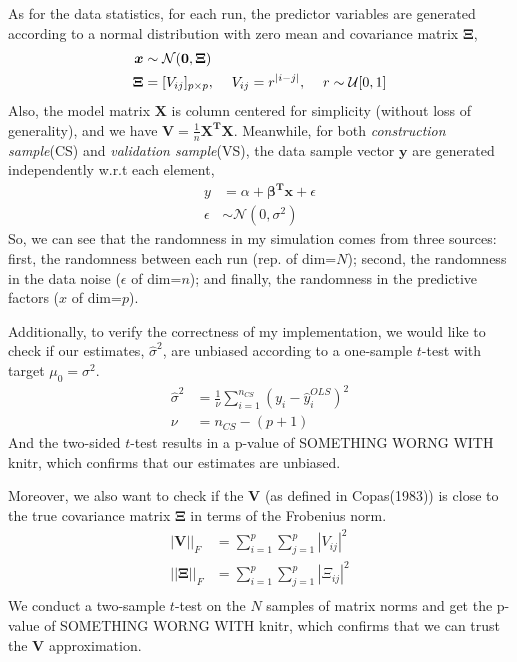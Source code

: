 \documentclass{article}
\newcommand{\rinline}[1]{SOMETHING WORNG WITH knitr}
\begin{document}
As for the data statistics, for each run, the predictor variables are
generated according to a normal distribution with zero mean and
covariance matrix $\bm{\Xi}$,
\begin{displaymath}
\begin{split}
\bm{x} &\sim  \mathcal{\bm{N}}(\bm{0}, \bm{\Xi})\\
\bm{\Xi} &= [V_{ij}]_{p\times p} , \hspace{12 pt} V_{ij} = r^{|i-j|},
\hspace{12 pt} r \sim \mathcal{U}[0,1]
\end{split}
\end{displaymath}
Also, the model matrix $\bm{X}$ is column centered for simplicity
(without loss of generality), and we have $\bm{V}=\frac{1}{n}\bm{X^TX}$. 
Meanwhile, for both \textit{construction sample}(CS) and
\textit{validation sample}(VS), the data sample vector
$\bm{y}$ are generated independently w.r.t each element,
\begin{displaymath}
\begin{split}
y &= \alpha + \bm{\beta^Tx} + \epsilon\\
\epsilon &\sim \mathcal{N}(0, \sigma^2)
\end{split}
\end{displaymath}
So, we can see that the randomness in my simulation comes from three
sources: first, the randomness between each run (rep. of dim=$N$); second, the
randomness in the data noise ($\epsilon$ of dim=$n$); and finally, the
randomness in the predictive factors ($x$ of dim=$p$).


Additionally, to verify the correctness of my implementation, we would
like to check if our estimates, $\hat{\sigma}^2$, are unbiased according to
a one-sample $t$-test with target $\mu_0=\sigma^2$.
\begin{displaymath}
\begin{split}
\hat{\sigma}^2 &= \frac{1}{\nu}\sum_{i=1}^{n_{CS}} (y_i - \hat{y}_i^{OLS})^2 \\
\nu &= n_{CS} - (p+1)
\end{split}
\end{displaymath}
And the two-sided $t$-test results in a p-value of
\rinline{t.test(sig2hat, mu=sig2)$p.value}, 
which confirms that our estimates are unbiased.

Moreover, we also want to check if the $\bm{V}$ (as defined in
Copas(1983)) is close to the true covariance matrix $\bm{\Xi}$ in
terms of the Frobenius norm. 
\begin{displaymath}
\begin{split}
|\bm{V}||_F &= \sum_{i=1}^p \sum_{j=1}^p |V_{ij}|^2 \\
||\bm{\Xi}||_F &= \sum_{i=1}^p \sum_{j=1}^p |\Xi_{ij}|^2 \\
\end{split}
\end{displaymath}
We conduct a two-sample $t$-test on the $N$ samples of matrix norms
and get the p-value of 
\rinline{t.test(Vnorm, covXnorm)$p.value},
which confirms that we can trust the $\bm{V}$ approximation.
\end{document}
